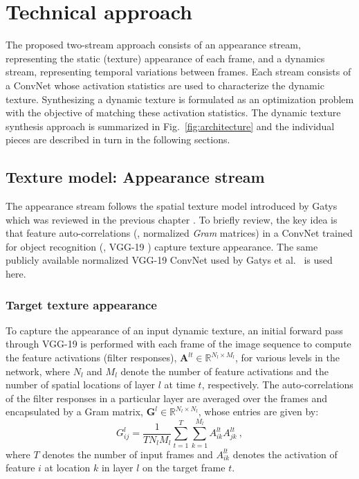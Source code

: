 \chapter{Technical approach }

The proposed two-stream approach consists of an appearance
stream, representing the static (texture) appearance of each frame,
and a dynamics stream, representing temporal 
variations between frames.
Each stream consists of a ConvNet whose activation 
statistics are used to characterize the dynamic texture.
Synthesizing a dynamic texture is formulated as an optimization 
problem with the objective of matching these activation 
statistics.
The dynamic texture synthesis approach is summarized in Fig.\ \ref{fig:architecture}
and the individual pieces are described in turn in the
following sections.



\section{Texture model: Appearance stream}

The appearance stream follows the spatial texture model
introduced by Gatys \etal \cite{gatys2015} which was reviewed in the previous chapter .
To briefly review, the key idea is that feature auto-correlations (\ie, normalized \emph{Gram} matrices) in a 
ConvNet trained for 
object recognition (\eg, VGG-19 \cite{simonyan2014very}) 
capture texture appearance.
The same publicly available normalized VGG-19 ConvNet \cite{simonyan2014very} used by Gatys et al.\ \cite{gatys2015} is used here.

\subsection{Target texture appearance}

To capture the appearance of an input dynamic texture, an initial forward pass through VGG-19 is performed with each frame of the image sequence to compute the feature activations (filter responses),
$\mathbf{A}^{lt} \in \mathbb{R}^{N_l\times M_l}$, for various
levels in the network, where $N_l$ and $M_l$ denote
the number of feature activations and the number of spatial locations of layer
$l$ at time $t$, respectively.
The auto-correlations of the filter responses in a particular layer are
averaged over the frames and encapsulated by a Gram matrix,
$\mathbf{G}^{l} \in \mathbb{R}^{N_l \times N_l}$, whose
entries are given by:
\begin{equation}
	G_{ij}^l = \frac{1}{T N_l M_l} \sum_{t=1}^T \sum_{k=1}^{M_l} A_{ik}^{lt} A_{jk}^{lt}\ ,
	\label{eq:gram_target}
\end{equation}
where $T$ denotes the number of input frames
and $A_{ik}^{lt}$ denotes the activation of feature $i$ at
location $k$ in layer $l$ on the target frame $t$.

